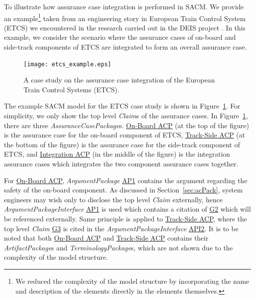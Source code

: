 To illustrate how assurance case integration is performed in SACM. 
We provide an example\footnote{We reduced the complexity of the model structure by incorporating the name and description of the elements directly in the elements themselves.} 
taken from an engineering story in European Train Control System (ETCS) we encountered  in the research carried out in the DEIS project \cite{wei2017deis}. 
In this example, we consider the scenario where the assurance cases of on-board and side-track components of ETCS are integrated to form an overall assurance case.
 
\begin{figure}
	\centering
	\texttt{[image: etcs\_example.eps]}
	\caption{A case study on the assurance case integration of the European Train Control Systems (ETCS).}
	\label{fig:etcs_example}
\end{figure}

The example SACM model for the ETCS case study is shown in Figure~\ref{fig:etcs_example}. 
For simplicity, we only show the top level \textit{Claim}s of the assurance cases. In Figure~\ref{fig:etcs_example}, there are three \textit{AssuranceCasePackage}s. 
\underline{On-Board ACP} (at the top of the figure) is the assurance case for the on-board component of ETCS, \underline{Track-Side ACP} (at the bottom of the figure) is the assurance case for the side-track component of ETCS, and \underline{Integration ACP} (in the middle of the figure) is the integration assurance cases which integrates the two component assurance cases together. 

For \underline{On-Board ACP}, \textit{ArgumentPackage} \underline{AP1} contains the argument regarding the safety of the on-board component. 
As discussed in Section~\ref{sec:acPack}, system engineers may wish only to disclose the top level \textit{Claim} externally, hence \textit{ArgumentPackageInterface} \underline{AP1} is used which contains a citation of \underline{G2} which will be referenced externally. 
Same principle is applied to \underline{Track-Side ACP}, where the top level \textit{Claim} \underline{G3} is cited in the \textit{ArgumentPackageInterface} \underline{API2}. 
It is to be noted that both \underline{On-Board ACP} and \underline{Track-Side ACP} contains their \textit{ArtifactPackage}s and \textit{TerminologyPackage}s, which are not shown due to the complexity of the model structure. 

